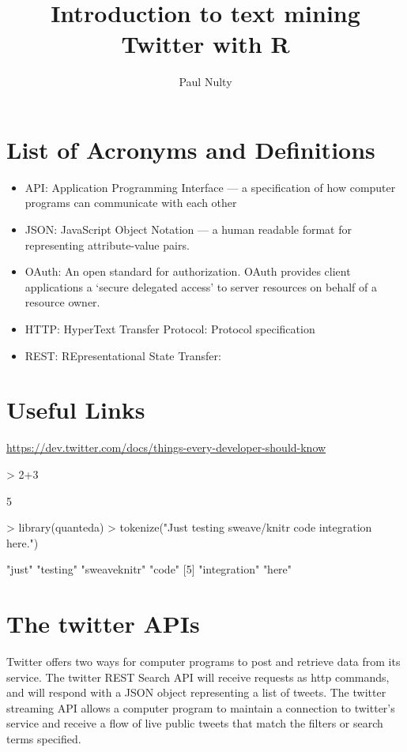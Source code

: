 \documentclass{article}
\title{Introduction to text mining Twitter with R}
\author{Paul Nulty}
\begin{document}

\maketitle
\clearpage

\section*{List of Acronyms and Definitions}
\begin{itemize}
  \item API: Application Programming Interface --- a specification of how computer programs can communicate with each other
  \item JSON: JavaScript Object Notation --- a human readable format for representing attribute-value pairs.
  \item OAuth: An open standard for authorization. OAuth provides client applications a `secure delegated access' to server resources on behalf of a resource owner.
  \item HTTP: HyperText Transfer Protocol: Protocol specification
  \item REST: REpresentational State Transfer:
\end{itemize}

\section*{Useful Links}
\url{https://dev.twitter.com/docs/things-every-developer-should-know}

\clearpage


\begin{Schunk}
\begin{Sinput}
> 2+3
\end{Sinput}
\begin{Soutput}
[1] 5
\end{Soutput}
\begin{Sinput}
> library(quanteda)
> tokenize("Just testing sweave/knitr code integration here.")
\end{Sinput}
\begin{Soutput}
[1] "just"        "testing"     "sweaveknitr" "code"       
[5] "integration" "here"       
\end{Soutput}
\end{Schunk}


\section*{The twitter APIs}
Twitter offers two ways for computer programs to post and retrieve data from its service. The twitter REST Search API will receive requests as http commands, and will respond with a JSON object representing a list of tweets. The twitter streaming API allows a computer program to maintain a connection to twitter's service and receive a flow of live public tweets that match the filters or search terms specified.
\end{document}
